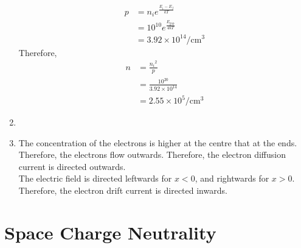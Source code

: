 \documentclass[titlepage, fleqn, a4paper, 12pt, twoside]{article}
\theoremstyle{definition}
\theoremstyle{theorem}
\begin{document}
\begin{solution}
\begin{enumerate}[leftmargin=*]
			\begin{align*}
				p & = n_i e^{\frac{E_i - E_f}{k T}}            \\
                                  & = 10^{10} e^{\frac{E_{\text{gap}}}{4 k T}} \\
                                  & = 3.92 \times 10^{14} \si{\per\centi\metre\cubed}
			\end{align*}
			Therefore,
			\begin{align*}
				n & = \frac{{n_i}^2}{p}                   \\
                                  & = \frac{10^{20}}{3.92 \times 10^{14}} \\
                                  & = 2.55 \times 10^5 \si{\per\centi\metre\cubed}
			\end{align*}
		\item
			~\\
			\begin{figure}[H]
				\centering
			\end{figure}
		\item
			The concentration of the electrons is higher at the centre that at the ends.
			Therefore, the electrons flow outwards.
			Therefore, the electron diffusion current is directed outwards.\\
			The electric field is directed leftwards for $x < 0$, and rightwards for $x > 0$.
			Therefore, the electron drift current is directed inwards.
	\end{enumerate}
\end{solution}

\section{Space Charge Neutrality}
\end{document}
